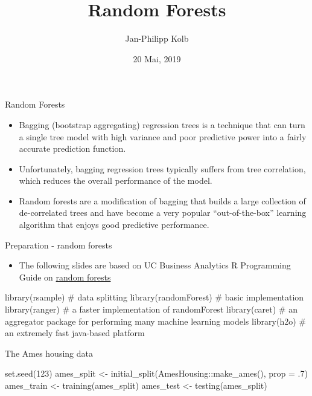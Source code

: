 \documentclass[10pt,ignorenonframetext,]{beamer}
\title{Random Forests}
\author{Jan-Philipp Kolb}
\date{20 Mai, 2019}
\newenvironment{Shaded}{}{}
\newcommand{\KeywordTok}[1]{\textcolor[rgb]{0.00,0.00,1.00}{#1}}
\newcommand{\DataTypeTok}[1]{#1}
\newcommand{\DecValTok}[1]{#1}
\newcommand{\StringTok}[1]{\textcolor[rgb]{0.00,0.50,0.50}{#1}}
\newcommand{\CommentTok}[1]{\textcolor[rgb]{0.00,0.50,0.00}{#1}}
\newcommand{\OperatorTok}[1]{#1}
\newcommand{\NormalTok}[1]{#1}
\providecommand{\tightlist}{%
  \setlength{\itemsep}{0pt}\setlength{\parskip}{0pt}}
\begin{document}
\frame{\titlepage}

\begin{frame}{Random Forests}

\begin{itemize}
\tightlist
\item
  Bagging (bootstrap aggregating) regression trees is a technique that
  can turn a single tree model with high variance and poor predictive
  power into a fairly accurate prediction function.
\item
  Unfortunately, bagging regression trees typically suffers from tree
  correlation, which reduces the overall performance of the model.
\item
  Random forests are a modification of bagging that builds a large
  collection of de-correlated trees and have become a very popular
  ``out-of-the-box'' learning algorithm that enjoys good predictive
  performance.
\end{itemize}

\end{frame}

\begin{frame}[fragile]{Preparation - random forests}

\begin{itemize}
\tightlist
\item
  The following slides are based on UC Business Analytics R Programming
  Guide on \href{http://uc-r.github.io/random_forests}{random forests}
\end{itemize}

\begin{Shaded}
\begin{Highlighting}[]
\KeywordTok{library}\NormalTok{(rsample)      }\CommentTok{# data splitting }
\KeywordTok{library}\NormalTok{(randomForest) }\CommentTok{# basic implementation}
\KeywordTok{library}\NormalTok{(ranger)       }\CommentTok{# a faster implementation of randomForest}
\KeywordTok{library}\NormalTok{(caret)        }\CommentTok{# an aggregator package for performing many machine learning models}
\KeywordTok{library}\NormalTok{(h2o)          }\CommentTok{# an extremely fast java-based platform}
\end{Highlighting}
\end{Shaded}

\end{frame}

\begin{frame}[fragile]{The Ames housing data}

\begin{Shaded}
\begin{Highlighting}[]
\KeywordTok{set.seed}\NormalTok{(}\DecValTok{123}\NormalTok{)}
\NormalTok{ames_split <-}\StringTok{ }\KeywordTok{initial_split}\NormalTok{(AmesHousing}\OperatorTok{::}\KeywordTok{make_ames}\NormalTok{(), }\DataTypeTok{prop =}\NormalTok{ .}\DecValTok{7}\NormalTok{)}
\NormalTok{ames_train <-}\StringTok{ }\KeywordTok{training}\NormalTok{(ames_split)}
\NormalTok{ames_test  <-}\StringTok{ }\KeywordTok{testing}\NormalTok{(ames_split)}
\end{Highlighting}
\end{Shaded}

\end{frame}
\end{document}
